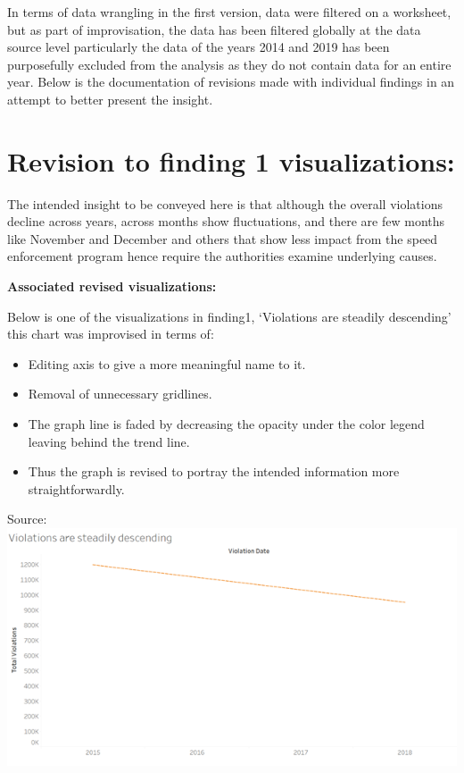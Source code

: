\documentclass[]{book}
\providecommand{\tightlist}{%
  \setlength{\itemsep}{0pt}\setlength{\parskip}{0pt}}
\begin{document}
In terms of data wrangling in the first version, data were filtered on a worksheet, but as part of improvisation, the data has been filtered globally at the data source level particularly the data of the years 2014 and 2019 has been purposefully excluded from the analysis as they do not contain data for an entire year. Below is the documentation of revisions made with individual findings in an attempt to better present the insight.

\hypertarget{revision-to-finding-1-visualizations}{%
\section{Revision to finding 1 visualizations:}\label{revision-to-finding-1-visualizations}}

The intended insight to be conveyed here is that although the overall violations decline across years, across months show fluctuations, and there are few months like November and December and others that show less impact from the speed enforcement program hence require the authorities examine underlying causes.

\textbf{Associated revised visualizations:}

Below is one of the visualizations in finding1, `Violations are steadily descending' this chart was improvised in terms of:

\begin{itemize}
\tightlist
\item
  Editing axis to give a more meaningful name to it.
\item
  Removal of unnecessary gridlines.
\item
  The graph line is faded by decreasing the opacity under the color legend leaving behind the trend line.
\item
  Thus the graph is revised to portray the intended information more straightforwardly.
\end{itemize}

Source:\citep{revised}
\includegraphics{images/Rev_img1.png}
\end{document}

